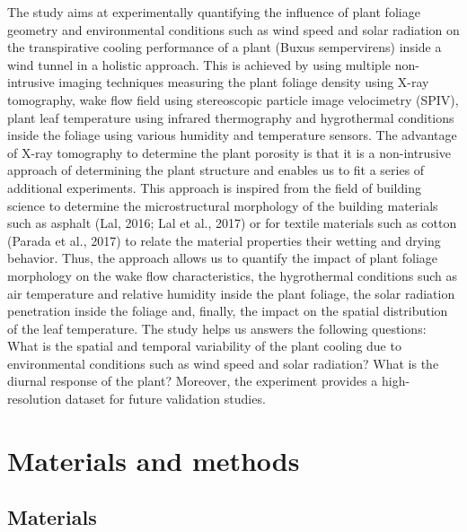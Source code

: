 The study aims at experimentally quantifying the influence of plant foliage geometry and environmental conditions such as wind speed and solar radiation on the transpirative cooling performance of a plant (Buxus sempervirens) inside a wind tunnel in a holistic approach. This is achieved by using multiple non-intrusive imaging techniques measuring the plant foliage density using X-ray tomography, wake flow field using stereoscopic particle image velocimetry (SPIV), plant leaf temperature using infrared thermography and hygrothermal conditions inside the foliage using various humidity and temperature sensors. The advantage of X-ray tomography to determine the plant porosity is that it is a non-intrusive approach of determining the plant structure and enables us to fit a series of additional experiments. This approach is inspired from the field of building science to determine the microstructural morphology of the building materials such as asphalt (Lal, 2016; Lal et al., 2017) or for textile materials such as cotton (Parada et al., 2017) to relate the material properties their wetting and drying behavior. Thus, the approach allows us to quantify the impact of plant foliage morphology on the wake flow characteristics, the hygrothermal conditions such as air temperature and relative humidity inside the plant foliage, the solar radiation penetration inside the foliage and, finally, the impact on the spatial distribution of the leaf temperature. The study helps us answers the following questions: What is the spatial and temporal variability of the plant cooling due to environmental conditions such as wind speed and solar radiation? What is the diurnal response of the plant? Moreover, the experiment provides a high-resolution dataset for future validation studies.


\section{Materials and methods}

\subsection{Materials}

